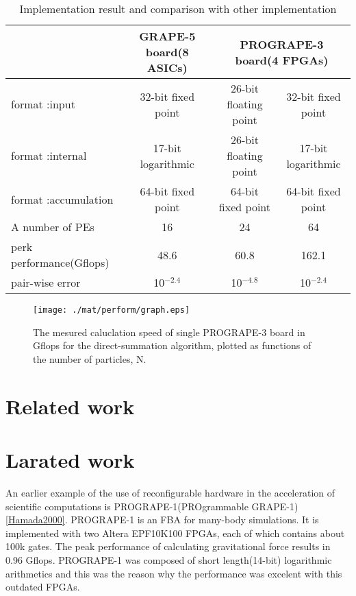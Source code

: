 \documentclass{llncs}
\begin{document}
\begin{table*}
\caption{Implementation result and comparison with other implementation}
\begin{center}
\begin{tabular}{lccc}
\hline
\hline
                     & GRAPE-5 board(8 ASICs) & \multicolumn{2}{c}{PROGRAPE-3 board(4 FPGAs)}  \\
\hline
format :input        & 32-bit fixed point  & 26-bit floating point & 32-bit fixed point \\
format :internal     & 17-bit logarithmic  & 26-bit floating point & 17-bit logarithmic \\
format :accumulation & 64-bit fixed point  & 64-bit fixed point    & 64-bit fixed point \\
A number of PEs      & 16                  &   24                  &   64               \\
perk performance(Gflops)    & 48.6         & 60.8                  & 162.1              \\
pair-wise error             & 10$^{-2.4}$   &  10$^{-4.8}$ & 10$^{-2.4}$                \\

\hline
\hline
\end{tabular}
\end{center}
\label{tabcompg5}
\end{table*}

\begin{figure}[htb]
\begin{center}
\texttt{[image: ./mat/perform/graph.eps]}
\caption{The mesured caluclation speed of single PROGRAPE-3 board in Gflops for the direct-summation algorithm, plotted as functions of the number of particles, N.}
\label{MESURE-PERFORM}
\end{center}
\end{figure}


\section{Related work}
\section{Larated work}
An earlier example of the use of reconfigurable hardware in the
acceleration of scientific computations is PROGRAPE-1(PROgrammable
GRAPE-1)\ref{Hamada2000}. PROGRAPE-1 is an FBA for many-body
simulations. It is implemented with two Altera EPF10K100 FPGAs, each
of which contains about 100k gates. The peak performance of
calculating gravitational force results in 0.96 Gflops.  PROGRAPE-1
was composed of short length(14-bit) logarithmic arithmetics and this
was the reason why the performance was excelent with this outdated
FPGAs.
\end{document}
